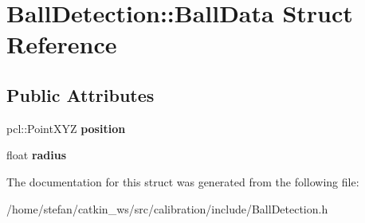 \hypertarget{structBallDetection_1_1BallData}{\section{\-Ball\-Detection\-:\-:\-Ball\-Data \-Struct \-Reference}
\label{structBallDetection_1_1BallData}
}
\subsection*{\-Public \-Attributes}
\begin{DoxyCompactItemize}
\item 
\hypertarget{structBallDetection_1_1BallData_ab3705f7c7f080becb7e1c973f5aebb83}{pcl\-::\-Point\-X\-Y\-Z {\bfseries position}}\label{structBallDetection_1_1BallData_ab3705f7c7f080becb7e1c973f5aebb83}

\item 
\hypertarget{structBallDetection_1_1BallData_ab7f40dea7492eb453587756ece2c088c}{float {\bfseries radius}}\label{structBallDetection_1_1BallData_ab7f40dea7492eb453587756ece2c088c}

\end{DoxyCompactItemize}


\-The documentation for this struct was generated from the following file\-:\begin{DoxyCompactItemize}
\item 
/home/stefan/catkin\-\_\-ws/src/calibration/include/\-Ball\-Detection.\-h\end{DoxyCompactItemize}
